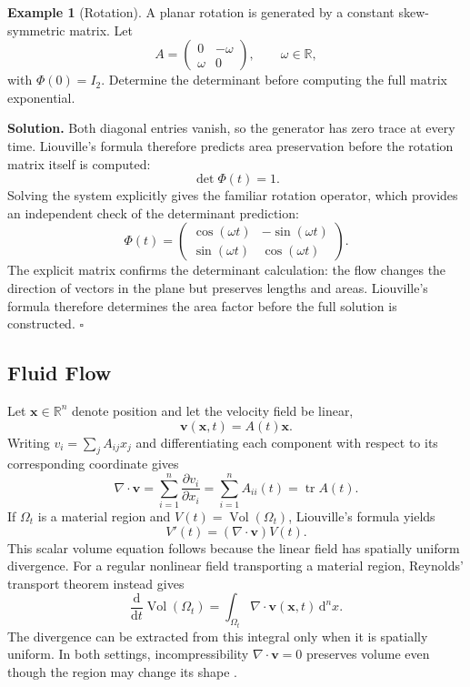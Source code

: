 \documentclass[11pt,a4paper]{article}
\newcommand{\be}{\begin{equation}}
\newcommand{\ee}{\end{equation}}
\newcommand{\lb}[1]{\label{#1}}
\newcommand{\dd}{\mathrm{d}}
\newcommand{\R}{\mathbb{R}}
\DeclareMathOperator{\tr}{tr}
\DeclareMathOperator{\Vol}{Vol}
\theoremstyle{definition}
\newtheorem{example}{Example}[section]
\newenvironment{solution}
{\par\noindent\textbf{Solution.}}
{\hfill$\square$\par}
\numberwithin{equation}{section}
\begin{document}
\begin{example}[Rotation]
A planar rotation is generated by a constant skew-symmetric matrix. Let
\be
A=
\begin{pmatrix}
0 & -\omega\\
\omega & 0
\end{pmatrix},
\qquad \omega\in\R,
\lb{eq:rotation-A}
\ee
with $\Phi(0)=I_2$. Determine the determinant before computing the full matrix exponential.
\end{example}

\begin{solution}
Both diagonal entries vanish, so the generator has zero trace at every time. Liouville's formula therefore predicts area preservation before the rotation matrix itself is computed:
\be
\det\Phi(t)=1.
\lb{eq:rotation-det}
\ee
Solving the system explicitly gives the familiar rotation operator, which provides an independent check of the determinant prediction:
\be
\Phi(t)=
\begin{pmatrix}
\cos(\omega t) & -\sin(\omega t)\\
\sin(\omega t) & \cos(\omega t)
\end{pmatrix}.
\lb{eq:rotation-phi}
\ee
The explicit matrix confirms the determinant calculation: the flow changes the direction of vectors in the plane but preserves lengths and areas. Liouville's formula therefore determines the area factor before the full solution is constructed.
\end{solution}


\subsection{Fluid Flow}

Let $\mathbf{x}\in\R^n$ denote position and let the velocity field be linear,
\be
\mathbf{v}(\mathbf{x},t)=A(t)\mathbf{x}.
\lb{eq:fluid-linear}
\ee
Writing $v_i=\sum_jA_{ij}x_j$ and differentiating each component with respect to its corresponding coordinate gives
\be
\nabla\cdot\mathbf{v}
=
\sum_{i=1}^{n}\frac{\partial v_i}{\partial x_i}
=
\sum_{i=1}^{n}A_{ii}(t)
=
\tr A(t).
\lb{eq:fluid-divergence}
\ee
If $\Omega_t$ is a material region and $V(t)=\Vol(\Omega_t)$, Liouville's formula yields
\be
V'(t)
=
(\nabla\cdot\mathbf{v})V(t).
\lb{eq:fluid-volume}
\ee
This scalar volume equation follows because the linear field has spatially uniform divergence. For a regular nonlinear field transporting a material region, Reynolds' transport theorem instead gives
\be
\frac{\dd}{\dd t}\Vol(\Omega_t)
=\int_{\Omega_t}\nabla\cdot\mathbf v(\mathbf x,t)\,\dd^n x.
\lb{eq:fluid-reynolds}
\ee
The divergence can be extracted from this integral only when it is spatially uniform. In both settings, incompressibility $\nabla\cdot\mathbf v=0$ preserves volume even though the region may change its shape \cite{batchelor1967}.
\end{document}
